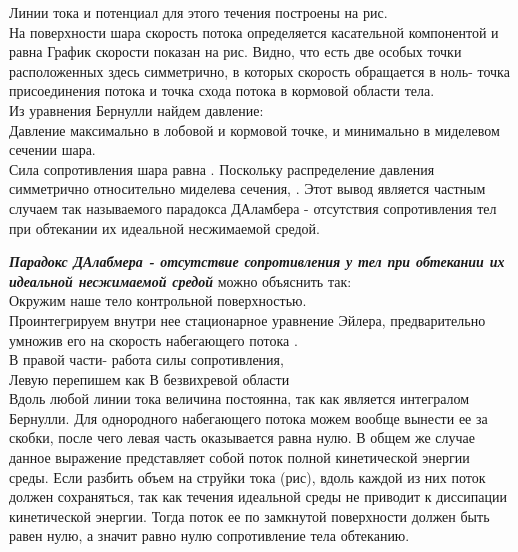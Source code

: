 \documentclass[
]{article}
\begin{document}
Линии тока и потенциал для этого течения построены на рис.\\
На поверхности шара скорость потока определяется касательной компонентой
и равна {}График скорости показан на рис. Видно, что есть две особых
точки расположенных здесь симметрично, в которых скорость обращается в
ноль- точка присоединения потока и точка схода потока в кормовой области
тела.\\
Из уравнения Бернулли найдем давление:\\
{}Давление максимально в лобовой и кормовой точке, и минимально в
миделевом сечении шара.\\
Сила сопротивления шара равна {}. Поскольку распределение давления
симметрично относительно миделева сечения, {}. Этот вывод является
частным случаем так называемого парадокса Д\textquotesingle Аламбера -
отсутствия сопротивления тел при обтекании их идеальной несжимаемой
средой.

\textbf{\emph{Парадокс Д\textquotesingle Алабмера - отсутствие
сопротивления у тел при обтекании их идеальной несжимаемой средой}}
можно объяснить так:\\
Окружим наше тело контрольной поверхностью.\\
Проинтегрируем внутри нее стационарное уравнение Эйлера, предварительно
умножив его на скорость набегающего потока {}.\\
{}В правой части- работа силы сопротивления,\\
{}Левую перепишем как {}В безвихревой области\\
{} {}Вдоль любой линии тока величина {} постоянна, так как является
интегралом Бернулли. Для однородного набегающего потока можем вообще
вынести ее за скобки, после чего левая часть оказывается равна нулю. В
общем же случае данное выражение представляет собой поток полной
кинетической энергии среды. Если разбить объем на струйки тока (рис),
вдоль каждой из них поток должен сохраняться, так как течения идеальной
среды не приводит к диссипации кинетической энергии. Тогда поток ее по
замкнутой поверхности должен быть равен нулю, а значит равно нулю
сопротивление тела обтеканию.
\end{document}
